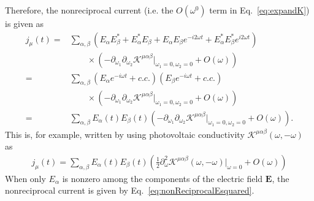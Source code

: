 \documentclass[twocolumn,superscriptaddress]{revtex4-1}
\begin{document}
Therefore, the nonreciprocal current (i.e. the $O(\omega^0)$ term in Eq.~\eqref{eq:expandK}) is given as
\begin{align}
  j_\mu(t)=&\sum_{\alpha,\beta}(E_\alpha E_\beta^* +E_\alpha^* E_\beta +E_\alpha E_\beta e^{-i2\omega t}+E_\alpha^* E_\beta^* e^{i2\omega t})\nonumber \\
  & \qquad \times(-\partial_{\omega_1}\partial_{\omega_2}\mathcal{K}^{\mu\alpha\beta}|_{\omega_1=0,\omega_2=0} +O(\omega)) \nonumber \\
  =&\sum_{\alpha,\beta}(E_\alpha e^{-i\omega t}+c.c.) (E_\beta e^{-i\omega t}+c.c.)\nonumber \\
  & \qquad \times(-\partial_{\omega_1}\partial_{\omega_2}\mathcal{K}^{\mu\alpha\beta}|_{\omega_1=0,\omega_2=0} +O(\omega))  \nonumber \\
  =&\sum_{\alpha,\beta}E_\alpha(t)E_\beta(t)(-\partial_{\omega_1}\partial_{\omega_2}\mathcal{K}^{\mu\alpha\beta}|_{\omega_1=0,\omega_2=0} +O(\omega)) .
  \label{eq:11ee}
\end{align}
This is, for example, written by using photovoltaic conductivity $\mathcal{K}^{\mu\alpha\beta}(\omega,-\omega)$ as
\begin{align}
  j_\mu(t)=\sum_{\alpha,\beta}E_\alpha(t)E_\beta(t)\left(\frac{1}{2}\partial_{\omega}^2\mathcal{K}^{\mu\alpha\beta}(\omega,-\omega)|_{\omega=0} +O(\omega)\right)
\end{align}
When only $E_\alpha$ is nonzero among the components of the electric field $\bm{E}$, the nonreciprocal current is given by Eq.~\eqref{eq:nonReciprocalEsquared}.
\end{document}
